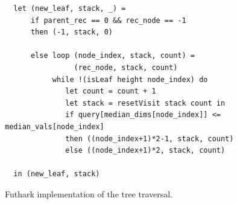 \begin{listing}[H]
\begin{verbatim}
  let (new_leaf, stack, _) =
      if parent_rec == 0 && rec_node == -1
      then (-1, stack, 0)

      else loop (node_index, stack, count) =
                (rec_node, stack, count)
           while !(isLeaf height node_index) do
              let count = count + 1
              let stack = resetVisit stack count in
              if query[median_dims[node_index]] <= median_vals[node_index]
              then ((node_index+1)*2-1, stack, count)
              else ((node_index+1)*2, stack, count)

  in (new_leaf, stack)
\end{verbatim}
\caption{Futhark implementation of the tree traversal.}
\label{lst:traverse}
\end{listing}
